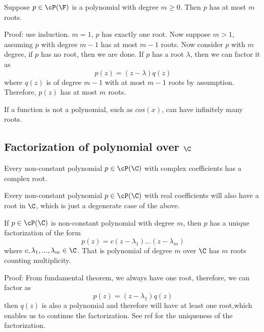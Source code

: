 \begin{refsection}
\begin{theorem}
\cite[123]{axler2015linear}Suppose $p\in \cP(\F)$ is a polynomial with degree $m \geq 0$. Then $p$ has at most $m$ roots.
\end{theorem}
Proof: use induction. $m=1$, $p$ has exactly one root. Now suppose $m>1$, assuming $p$ with degree $m-1$ has at most $m-1$ roots. Now consider $p$ with $m$ degree, if $p$ has no root, then we are done. If $p$ has a root $\lambda$, then we can factor it as
$$p(z)=(z-\lambda)q(z)$$ where $q(z)$ is of degree $m-1$ with at most $m-1$ roots by assumption. Therefore, $p(z)$ has at most $m$ roots. 

\begin{remark}
If a function is not a polynomial, such as $cos(x)$, can have infinitely many roots. 
\end{remark}

\subsection{Factorization of polynomial over $\C$}
\begin{theorem}\label{ch:topics-in-abstract-algebra:th:fundamentalthalgebra}
\cite[124]{axler2015linear}Every non-constant polynomial $p\in \cP(\C)$ with complex coefficients has a complex root. 
\end{theorem}

\begin{remark}
Every non-constant polynomial $p\in \cP(\C)$ with real coefficients will also have a root in $\C$, which is just a degenerate case of the above. 
\end{remark}

\begin{theorem}
\cite[125]{axler2015linear}
If $p\in \cP(\C)$ is  non-constant polynomial with degree $m$, then $p$ has a unique factorization of the form
$$p(z) = c(z-\lambda_1)...(z-\lambda_m)$$
where $c,\lambda_1,...,\lambda_m \in \C$. That is polynomial of degree $m$ over $\C$ has $m$ roots counting multiplicity.
\end{theorem}
Proof: From fundamental theorem, we always have one root, therefore, we can factor as
$$p(z) = (z-\lambda_1)q(z)$$
then $q(z)$ is also a polynomial and therefore will have at least one root,which enables us to continue the factorization. See ref for the uniqueness of the factorization.



\end{refsection}
